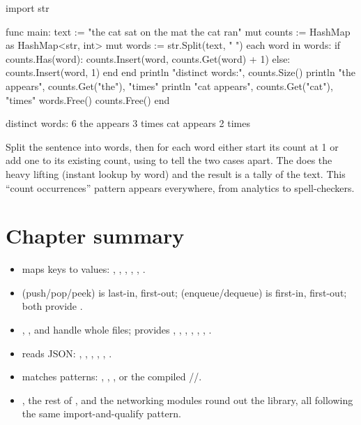 \begin{salamen}
import str

func main:
    text := "the cat sat on the mat the cat ran"
    mut counts := HashMap {} as HashMap<str, int>
    mut words := str.Split(text, " ")
    each word in words:
        if counts.Has(word):
            counts.Insert(word, counts.Get(word) + 1)
        else:
            counts.Insert(word, 1)
        end
    end
    println "distinct words:", counts.Size()
    println "the appears", counts.Get("the"), "times"
    println "cat appears", counts.Get("cat"), "times"
    words.Free()
    counts.Free()
end
\end{salamen}

\begin{progout}
distinct words: 6
the appears 3 times
cat appears 2 times
\end{progout}

Split the sentence into words, then for each word either start its count at 1 or
add one to its existing count, using  to tell the two cases apart. The
 does the heavy lifting (instant lookup by word) and the result
is a tally of the text. This ``count occurrences'' pattern appears everywhere,
from analytics to spell-checkers.

\section{Chapter summary}

\begin{itemize}[leftmargin=1.4em]
  \item {} maps keys to values: , ,
        , , , .
  \item \begin{sloppypar}
         (push/pop/peek) is last-in, first-out;
         (enqueue/dequeue) is first-in, first-out; both
        provide .
        \end{sloppypar}
  \item {}, , and  handle whole
        files;  provides , , ,
        , , , .
  \item {} reads JSON: , , ,
        , , .
  \item {} matches patterns: , ,
        , or the compiled //.
  \item {}, the rest of , and the networking modules round out the
        library, all following the same import-and-qualify pattern.
\end{itemize}

